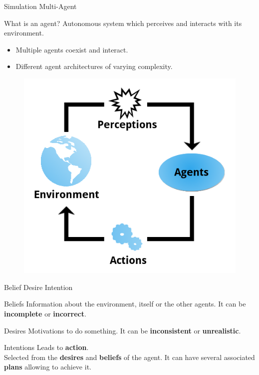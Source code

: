 \documentclass{beamer}
\begin{document}
    \begin{frame}{Simulation Multi-Agent}
      \begin{block}{What is an agent?}
        Autonomous system which perceives and interacts with its environment.
      \end{block}
      \begin{itemize}
        \item Multiple agents coexist and interact.
				\item Different agent architectures of varying complexity.
      \end{itemize}
			\begin{figure}[h]
        \includegraphics[scale=0.25]{mas_graph.png}
      \end{figure}
    \end{frame}

    \begin{frame}{Belief Desire Intention}
      \begin{block}{Beliefs}
        Information about the environment, itself or the other agents. It can be \textbf{incomplete} or \textbf{incorrect}.
      \end{block}
      \begin{block}{Desires}
        Motivations to do something. It can be \textbf{inconsistent} or \textbf{unrealistic}.
      \end{block}
      \begin{block}{Intentions}
				Leads to \textbf{action}. \\
				Selected from the \textbf{desires} and \textbf{beliefs} of the agent. It can have several associated \textbf{plans} allowing to achieve it.
      \end{block}
    \end{frame}
\end{document}
